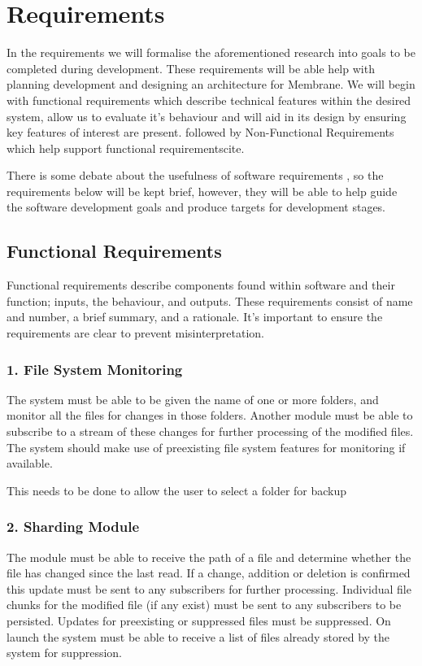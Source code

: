 \documentclass[a4paper, 11pt, twocolumn, twoside]{report}
\begin{document}
\section{Requirements}

In the requirements we will formalise the aforementioned research into goals to be completed during development. These requirements will be able help with planning development and designing an architecture for Membrane. We will begin with functional requirements which describe technical features within the desired system, allow us to evaluate it's behaviour and will aid in its design by ensuring key features of interest are present.  followed by Non-Functional Requirements which help support functional requirements{cite}.

There is some debate about the usefulness of software requirements , so the requirements below will be kept brief, however, they will be able to help guide the software development goals and produce targets for development stages.

\subsection{Functional Requirements}

Functional requirements describe components found within software and their function; inputs, the behaviour, and outputs. These requirements consist of name and number, a brief summary, and a rationale. It's important to ensure the requirements are clear to prevent misinterpretation.

\subsubsection{1. File System Monitoring}
The system must be able to be given the name of one or more folders, and monitor all the files for changes in those folders. Another module must be able to subscribe to a stream of these changes for further processing of the modified files. The system should make use of preexisting file system features for monitoring if available.

This needs to be done to allow the user to select a folder for backup 

\subsubsection{2. Sharding Module}
The module must be able to receive the path of a file and determine whether the file has changed since the last read. If a change, addition or deletion is confirmed this update must be sent to any subscribers for further processing. Individual file chunks for the modified file (if any exist) must be sent to any subscribers to be persisted. Updates for preexisting or suppressed files must be suppressed. On launch the system must be able to receive a list of files already stored by the system for suppression.
\end{document}
